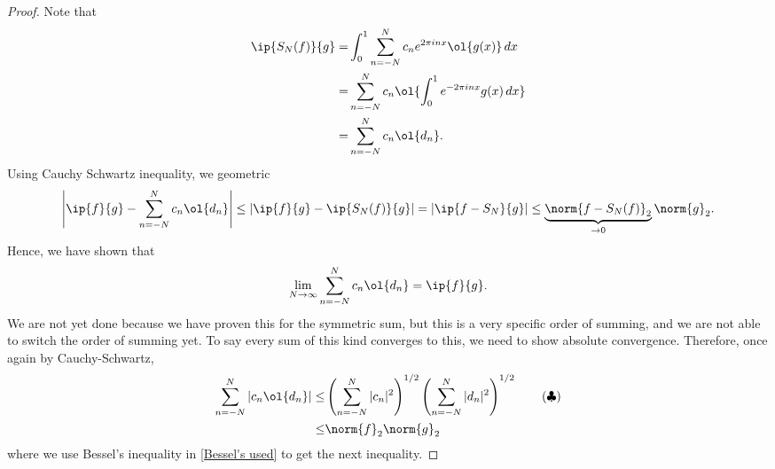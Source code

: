 \begin{proof}
    Note that
    \begin{align*} 
        \ip{S_N(f)}{g}=&\int_0^1\sum_{n=-N}^N c_ne^{2\pi inx}\ol{g(x)} \, dx\\
                      =&\sum_{n=-N}^N c_n\ol{\int_0^1 e^{-2\pi inx}g(x) \, dx}\\
                      =&\sum_{n=-N}^N c_n\ol{d_n}.
    \end{align*}
    Using Cauchy Schwartz inequality, we geometric
    \begin{equation*} 
        \left|\ip{f}{g}-\sum_{n=-N}^N c_n\ol{d_n}\right|\leq |\ip{f}{g}-\ip{S_N(f)}{g}|=|\ip{f-S_N}{g}|\leq\underbrace{\norm{f-S_N(f)}_2}_{\to 0}\norm{g}_2.
    \end{equation*}
    Hence, we have shown that 
    \begin{equation*} 
        \lim_{N\to\infty}\sum_{n=-N}^N c_n\ol{d_n}=\ip{f}{g}.
    \end{equation*}
    We are not yet done because we have proven this for the symmetric sum, but this is a very specific order of summing, and we are not able to switch the order of summing yet. To say every sum of this kind converges to this, we need to show absolute convergence. Therefore, once again by Cauchy-Schwartz,
    \begin{align*} 
        \sum_{n=-N}^N |c_n\ol{d_n}|\leq&\left(\sum_{n=-N}^N |c_n|^2\right)^{1/2}\left(\sum_{n=-N}^N |d_n|^2\right)^{1/2}\tag{\(\clubsuit\)}\label{Bessel's used}\\
        \leq&\norm{f}_2\norm{g}_2
    \end{align*}
    where we use Bessel's inequality in \cref{Bessel's used} to get the next inequality.
\end{proof}

